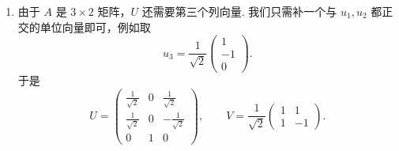 \begin{solution}
\begin{enumerate}
              对于 $v_2$，
              \[
                  Av_2
                  =
                  \frac{1}{\sqrt{2}}
                  \begin{pmatrix}
                      1 & 1  \\
                      1 & 1  \\
                      1 & -1
                  \end{pmatrix}
                  \begin{pmatrix}
                      1  \\
                      -1
                  \end{pmatrix}
                  =
                  \frac{1}{\sqrt{2}}
                  \begin{pmatrix}
                      0 \\
                      0 \\
                      2
                  \end{pmatrix}
                  =
                  \begin{pmatrix}
                      0      \\
                      0      \\
                      \sqrt{2}
                  \end{pmatrix},
              \]
              故
              \[
                  u_2 = \frac{1}{\sqrt{2}}Av_2
                  =
                  \begin{pmatrix}
                      0 \\
                      0 \\
                      1
                  \end{pmatrix}.
              \]

        \item 由于 $A$ 是 $3 \times 2$ 矩阵，$U$ 还需要第三个列向量. 我们只需补一个与 $u_1, u_2$ 都正交的单位向量即可，例如取
              \[
                  u_3 = \frac{1}{\sqrt{2}}
                  \begin{pmatrix}
                      1  \\
                      -1 \\
                      0
                  \end{pmatrix}.
              \]
              于是
              \[
                  U =
                  \begin{pmatrix}
                      \frac{1}{\sqrt{2}} & 0 & \frac{1}{\sqrt{2}}  \\
                      \frac{1}{\sqrt{2}} & 0 & -\frac{1}{\sqrt{2}} \\
                      0                  & 1 & 0
                  \end{pmatrix},\qquad
                  V =
                  \frac{1}{\sqrt{2}}
                  \begin{pmatrix}
                      1 & 1  \\
                      1 & -1
                  \end{pmatrix}.
              \]


\end{enumerate}
\end{solution}
